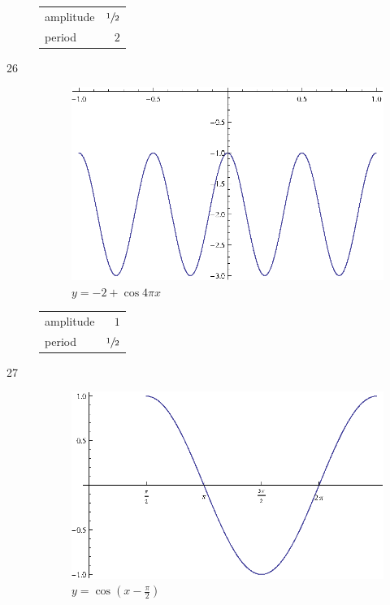 \documentclass{exam}
\begin{document}
\begin{description}
        \begin{tabular}[H]{lr}
          \toprule
          amplitude & $\sfrac{1}{2}$ \\
          period    & $2$ \\
          \bottomrule
        \end{tabular}

      \item[26]
        \begin{figure}[H]
          \centering
          \includegraphics[scale=0.9]{exercise26.eps}
          \caption{$y = -2 + \cos 4 \pi x$}
        \end{figure}

        \begin{tabular}[H]{lr}
          \toprule
          amplitude & $1$ \\
          period    & $\sfrac{1}{2}$ \\
          \bottomrule
        \end{tabular}

      \item[27]
        \begin{figure}[H]
          \centering
          \includegraphics[scale=0.8]{exercise27.eps}
          \caption{$y = \cos \left( x - \frac{\pi}{2} \right)$}
        \end{figure}


\end{description}
\end{document}

